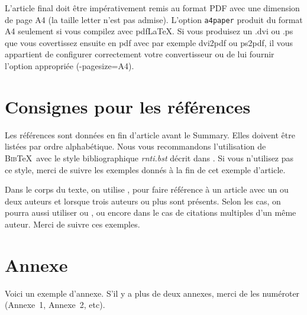 \documentclass[a4paper,pagenum,french,showlayout]{rnti}
\begin{document}
L'article final doit être impérativement remis au format PDF avec
une dimension de page A4 (la taille letter n'est pas admise).
L'option \texttt{a4paper} produit du format A4 seulement si vous
compilez avec pdf\LaTeX{}. Si vous produisez un .dvi ou .ps que vous
covertissez ensuite en pdf avec par exemple dvi2pdf ou ps2pdf, il
vous appartient de configurer correctement votre convertisseur ou de
lui fournir l'option appropriée (-pagesize=A4).


\section{Consignes pour les références}

Les références sont données en fin d'article avant le
\guilo{}Summary\guilf{}. Elles doivent être listées par ordre
alphabétique.  Nous vous recommandons l'utilisation de
\textsc{Bib}\TeX\ avec le style bibliographique \textit{rnti.bst}
décrit dans \citet{ritschard:2005rnti}. Si vous n'utilisez pas ce
style, merci de suivre les exemples donnés à la fin de cet exemple
d'article.

Dans le corps du texte, on utilise \citet{thSau00}, \citet{HolWil90}
pour faire référence à un article avec un ou deux auteurs et
\citet{lioni01} lorsque trois auteurs ou plus sont présents.  Selon
les cas, on pourra aussi utiliser \citep{thSau00} ou
\citep[voir][chapitre 4]{brei:frie:olsh:ston:1984}, ou encore
\citet{quin:1986ID3,quin:1993} dans le cas de citations multiples
d'un même auteur. Merci de suivre ces exemples.






\appendix
\section*{Annexe}

Voici un exemple d'annexe. S'il y a plus de deux annexes, merci de
les numéroter (Annexe~1, Annexe~2, etc).

\Fr
\end{document}
